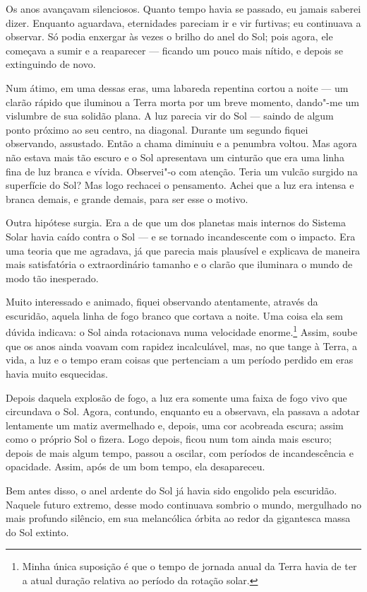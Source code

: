 Os anos avançavam silenciosos. Quanto tempo havia se passado, eu jamais saberei dizer. Enquanto aguardava,
eternidades pareciam ir e vir furtivas; eu continuava a observar. Só podia enxergar às vezes o brilho do anel do
Sol; pois agora, ele começava a sumir e a reaparecer --- ficando um pouco mais nítido, e depois se extinguindo de novo.

Num átimo, em uma dessas eras, uma labareda repentina cortou a noite --- um clarão rápido que iluminou a Terra morta por
um breve momento, dando"-me um vislumbre de sua solidão plana. A luz parecia vir do Sol --- saindo de algum ponto próximo
ao seu centro, na diagonal. Durante um segundo fiquei observando, assustado. Então a chama diminuiu e a penumbra
voltou. Mas agora não estava mais tão escuro e o Sol apresentava um cinturão que era uma linha fina de luz branca e
vívida. Observei"-o com atenção. Teria um vulcão surgido na superfície do Sol? Mas logo rechacei o pensamento. Achei que
a luz era intensa e branca demais, e grande demais, para ser esse o motivo.

Outra hipótese surgia. Era a de que um dos planetas mais internos do Sistema Solar havia caído contra o Sol --- e se
tornado incandescente com o impacto. Era uma teoria que me agradava, já que parecia mais plausível e explicava de
maneira mais satisfatória o extraordinário tamanho e o clarão que iluminara o mundo de modo tão inesperado.

Muito interessado e animado, fiquei observando atentamente, através da escuridão, aquela linha de fogo branco que
cortava a noite. Uma coisa ela sem dúvida indicava: o Sol ainda rotacionava
numa velocidade enorme.\footnote{ Minha única suposição é que o tempo de
jornada anual da Terra havia de ter a atual duração relativa ao período da rotação solar.} Assim, soube
que os anos ainda voavam com rapidez incalculável, mas, no que tange à Terra, a vida, a luz e o tempo eram coisas que
pertenciam a um período perdido em eras havia muito esquecidas.

Depois daquela explosão de fogo, a luz era somente uma faixa de fogo vivo que circundava o Sol. Agora, contundo,
enquanto eu a observava, ela passava a adotar lentamente um matiz avermelhado e, depois, uma cor acobreada escura;
assim como o próprio Sol o fizera. Logo depois, ficou num tom ainda mais escuro; depois de mais algum tempo, passou
a oscilar, com períodos de incandescência e opacidade. Assim, após de um bom tempo, ela desapareceu.

Bem antes disso, o anel ardente do Sol já havia sido engolido pela escuridão. Naquele futuro extremo, desse modo continuava
sombrio o mundo, mergulhado no mais profundo silêncio, em sua melancólica órbita ao redor da gigantesca massa do Sol
extinto.

